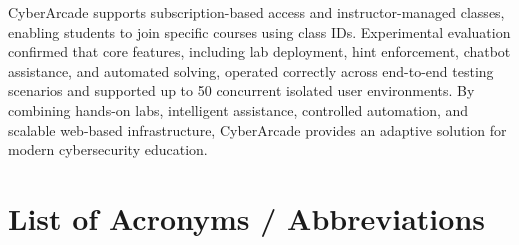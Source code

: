 \documentclass[12pt,a4paper]{report}
\begin{document}
CyberArcade supports subscription-based access and instructor-managed classes, enabling students to
join specific courses using class IDs. Experimental evaluation confirmed that core features, including
lab deployment, hint enforcement, chatbot assistance, and automated solving, operated correctly across
end-to-end testing scenarios and supported up to 50 concurrent isolated user environments. By combining
hands-on labs, intelligent assistance, controlled automation, and scalable web-based infrastructure,
CyberArcade provides an adaptive solution for modern cybersecurity education.

\clearpage

\tableofcontents
\clearpage

\listoffigures
{}
\clearpage

\listoftables
{}
\clearpage

\chapter*{List of Acronyms / Abbreviations}
\end{document}

